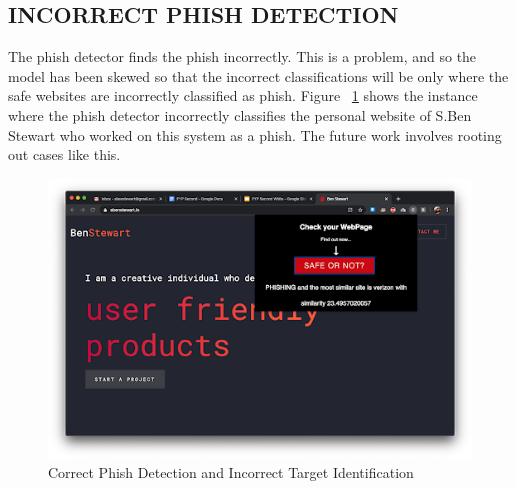 \subsection{INCORRECT PHISH DETECTION}
The phish detector finds the phish incorrectly. This is a problem, and so the model has been skewed so that the incorrect classifications will be only where the safe websites are incorrectly classified as phish. Figure ~\ref{fig:i} shows the instance where the phish detector incorrectly classifies the personal website of S.Ben Stewart who worked on this system as a phish. The future work involves rooting out cases like this.

\begin{figure}[htp]
\centering
\includegraphics[scale=0.5]{Figures/image19.png}
\caption{Correct Phish Detection and Incorrect Target Identification}
\label{fig:i}
\end{figure}

